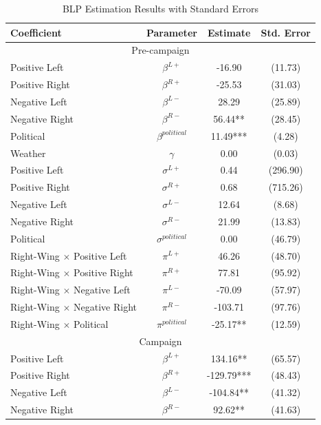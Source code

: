 \documentclass[12pt]{article}
\begin{document}
	\begin{table}[p]
					\caption{BLP Estimation Results with Standard Errors}
					\label{tab:results_blp}
		\centering
		\begin{threeparttable}
			\begin{tabular}{lccc}
				\hline
				\textbf{Coefficient} & \textbf{Parameter} & \textbf{Estimate} & \textbf{Std. Error} \\
				\hline
				\multicolumn{4}{c}{Pre-campaign} \\
				\hline
				\hline
				Positive Left & $\beta^{L+}$ & -16.90 & (11.73) \\
				Positive Right & $\beta^{R+}$ & -25.53 & (31.03) \\
				Negative Left & $\beta^{L-}$ & 28.29 & (25.89) \\
				Negative Right & $\beta^{R-}$ & 56.44** & (28.45) \\
				Political & $\beta^{political}$ & 11.49*** & (4.28) \\
				Weather & $\gamma$ & 0.00 & (0.03) \\
				\hline
				Positive Left & $\sigma^{L+}$ & 0.44 & (296.90) \\
				Positive Right & $\sigma^{R+}$ & 0.68 & (715.26) \\
				Negative Left & $\sigma^{L-}$ & 12.64 & (8.68) \\
				Negative Right & $\sigma^{R-}$ & 21.99 & (13.83) \\
				Political & $\sigma^{political}$ & 0.00 & (46.79) \\
				\hline
				Right-Wing $\times$  Positive Left & $\pi^{L+}$ & 46.26 & (48.70) \\
				Right-Wing $\times$  Positive Right & $\pi^{R+}$ & 77.81 & (95.92) \\
				Right-Wing $\times$  Negative Left & $\pi^{L-}$ & -70.09 & (57.97) \\
				Right-Wing $\times$  Negative Right & $\pi^{R-}$ & -103.71 & (97.76) \\
				Right-Wing $\times$  Political & $\pi^{political}$ & -25.17** & (12.59) \\
				\hline
				\hline
				\multicolumn{4}{c}{Campaign} \\
				\hline
				\hline
				Positive Left & $\beta^{L+}$ & 134.16** & (65.57) \\
				Positive Right & $\beta^{R+}$ & -129.79*** & (48.43) \\
				Negative Left & $\beta^{L-}$ & -104.84** & (41.32) \\
				Negative Right & $\beta^{R-}$ & 92.62** & (41.63) \\

\end{tabular}
\end{threeparttable}
\end{table}
\end{document}
